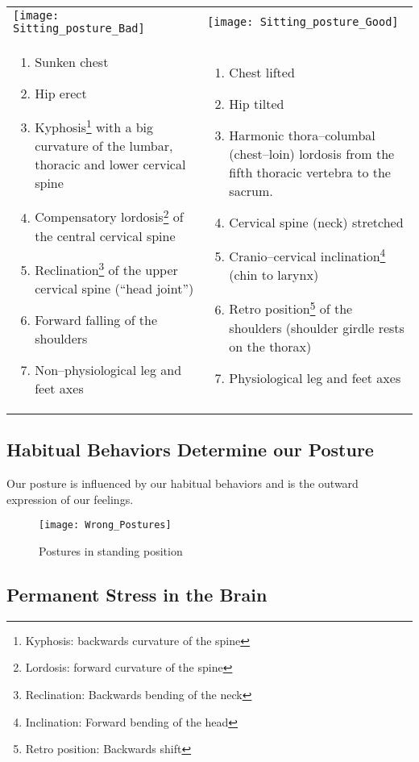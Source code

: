 \documentclass[../main.tex]{subfiles}
\begin{document}
\begin{minipage}{\textwidth}
\begin{tabular}{p{6.3cm}p{6.3cm}}
  \texttt{[image: Sitting\_posture\_Bad]} &

\texttt{[image: Sitting\_posture\_Good]} \\

  \begin{enumerate}
\item {Sunken chest}
\item Hip erect
\item Kyphosis\footnote{Kyphosis: backwards curvature of the spine} with a big {curvature} of the lumbar, thoracic and lower cervical {spine}
\item Compensatory lordosis\footnote{Lordosis: forward curvature of the spine}
  of the central cervical spine
\item Reclination\footnote{Reclination: Backwards bending of the neck}
  of the upper cervical spine (``head joint'')
\item {Forward falling of the shoulders}
\item Non--physiological leg and feet axes
    \end{enumerate} &

  \begin{enumerate}
\item {Chest lifted}
\item Hip tilted
\item Harmonic thora--columbal (chest--loin) {lordosis} from the fifth thoracic vertebra to the sacrum.
\item Cervical spine (neck) stretched
\item Cranio--cervical inclination\footnote{Inclination: Forward bending of the head} ({chin to larynx})
\item Retro position\footnote{Retro position: Backwards shift} of the shoulders ({shoulder girdle rests on the thorax})
\item Physiological leg and feet axes

    \end{enumerate}
\\
  
  \end{tabular}
\end{minipage}

\newpage
\subsection{Habitual Behaviors Determine our Posture}

Our posture is influenced by our habitual behaviors and is the outward expression of our feelings.
\begin{figure}[h!]
  \centering
  \texttt{[image: Wrong\_Postures]}
  \caption{Postures in standing position}
\end{figure}
\newpage

\subsection{Permanent Stress in the Brain}
\end{document}
